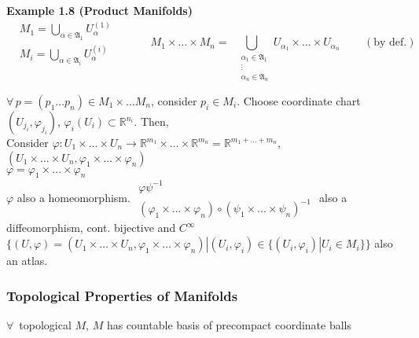 \textbf{Example 1.8 (Product Manifolds)}
\[
\begin{aligned}
  & M_1 = \bigcup_{\alpha \in \mathfrak{A}_1} U_{\alpha}^{(1)} \\ 
  & M_i = \bigcup_{\alpha \in \mathfrak{A}_i} U_{\alpha}^{(i)} 
\end{aligned} \quad \quad \quad \, 
M_1 \times \dots \times M_n = \bigcup_{ \begin{aligned} & \alpha_1 \in \mathfrak{A}_1 \\ 
& \vdots \\ 
    & \alpha_n \in \mathfrak{A}_n \end{aligned} }  U_{\alpha_1} \times \dots \times U_{\alpha_n} \quad \quad \, (\text{by def.})
\]

$\forall \, p = (p_1 \dots p_n) \in M_1 \times \dots M_n$, consider $p_i \in M_i$.  Choose coordinate chart $(U_{j_i}, \varphi_{j_i})$, $\varphi_i(U_i) \subset \mathbb{R}^{n_i}$.  Then,  \\

Consider $\varphi : U_1 \times \dots \times U_n \to \mathbb{R}^{m_1} \times \dots \times \mathbb{R}^{m_n} = \mathbb{R}^{ m_1 + \dots + m_n}$, $(U_1 \times \dots \times U_n, \varphi_1 \times \dots \times \varphi_n)$ \\
$\varphi = \varphi_1 \times \dots \times \varphi_n$\\
$\varphi$ also a homeomorphism.  $\begin{gathered} \varphi \psi^{-1} \\ (\varphi_1 \times \dots \times \varphi_n) \circ(\psi_1 \times \dots \times \psi_n)^{-1} \end{gathered}$ also a diffeomorphism, cont. bijective and $C^{\infty}$ \\
$\lbrace (U, \varphi)  = (U_1 \times \dots \times U_n, \varphi_1 \times \dots \times \varphi_n) | (U_i, \varphi_i) \in \lbrace (U_i, \varphi_i) | U_i \in M_i \rbrace \rbrace$ also an atlas.  



\subsubsection*{Topological Properties of Manifolds}

\begin{lemma}[1.10]
$\forall \, $ topological $M$, $M$ has countable basis of precompact coordinate balls
\end{lemma}

